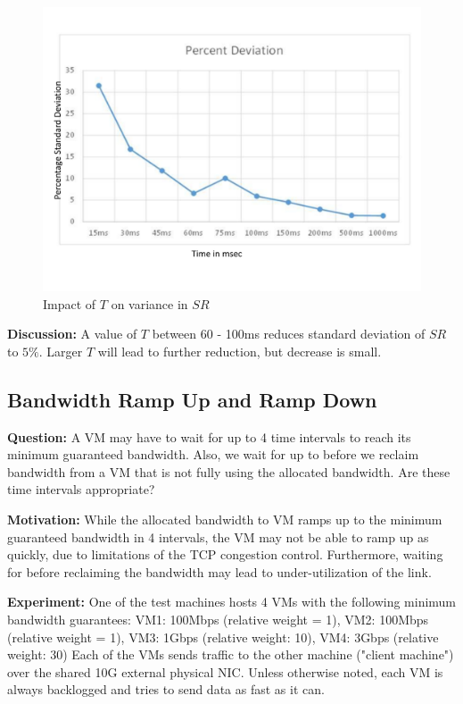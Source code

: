 \begin{figure}
\centering
\includegraphics[width=0.7\columnwidth, trim=60pt 20mm 0pt 8mm]{figures/variation}
\caption{Impact of $T$ on variance in $SR$}
\label{variation}
\vspace{-3mm}
\end{figure}

{\bf Discussion:} A value of $T$ between 60 - 100ms reduces standard deviation
of $SR$ to $5\%$.  Larger $T$ will lead to further reduction, but decrease is
small.

\subsection{Bandwidth Ramp Up and Ramp Down}
{\bf Question:} A VM may have to wait for up to 4 time intervals to reach its
minimum guaranteed bandwidth. Also, we wait for up to  before we
reclaim bandwidth from a VM that is not fully using the allocated bandwidth. Are
these time intervals appropriate?

{\bf Motivation:}  While the allocated bandwidth to VM ramps up to the minimum
guaranteed bandwidth in 4 intervals, the VM may not be able to ramp up as
quickly, due to limitations of the TCP congestion control. Furthermore, waiting
for  before reclaiming the bandwidth may lead to
under-utilization of the link.

{\bf Experiment:}  One of the test machines hosts 4 VMs with the following
minimum bandwidth guarantees: VM1: 100Mbps (relative weight = 1), VM2: 100Mbps
(relative weight = 1), VM3: 1Gbps (relative weight: 10), VM4: 3Gbps (relative
weight: 30) Each of the VMs sends traffic to the other machine ("client
machine") over the shared 10G external physical NIC.  Unless otherwise noted,
each VM is always backlogged and tries to send data as fast as it can.

